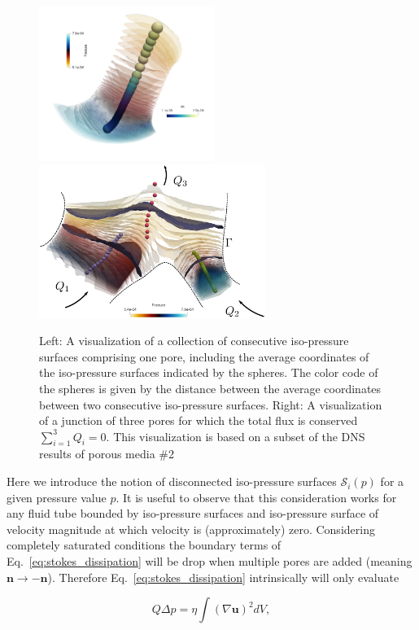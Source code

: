 \documentclass[draft]{agujournal2019}
\begin{document}
\begin{centering}
\begin{figure}[t!]\label{fig:isop_surfaces}
\includegraphics[height=5cm]{figures/example_pore.png}~~~~
\includegraphics[height=5cm]{figures/merging_pores.eps}
\caption{Left: A visualization of a collection of consecutive iso-pressure surfaces comprising one pore, including the average coordinates of the iso-pressure surfaces indicated by the spheres. The color code of the spheres is given by the distance between the average coordinates between two consecutive iso-pressure surfaces. Right: A visualization of a junction of three pores for which the total flux is conserved $\sum_{i=1}^3 Q_i = 0$. This visualization is based on a subset of the DNS results of porous media \#2}
\end{figure}
\end{centering}
Here we introduce the notion of disconnected iso-pressure surfaces $\mathcal{S}_i(p)$ for a given pressure value $p$.
It is useful to observe that this consideration works for any fluid tube bounded by iso-pressure surfaces and iso-pressure surface of velocity magnitude at which velocity is (approximately) zero. Considering completely saturated conditions the boundary terms of Eq.~\ref{eq:stokes_dissipation} will be drop when multiple pores are added (meaning $\mathbf{n}\rightarrow -\mathbf{n}$). Therefore Eq.~\ref{eq:stokes_dissipation} intrinsically will only evaluate

\begin{equation}\label{eq:pore_based_energy_dissipation}
Q \Delta p=\eta \int (\nabla \mathbf{u})^2 dV,
\end{equation}
\end{document}
